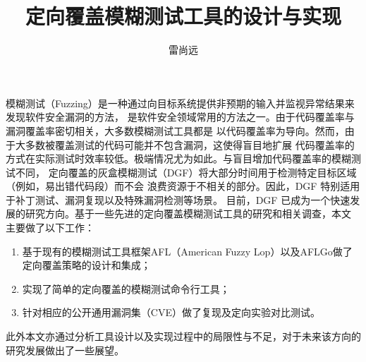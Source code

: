 \documentclass[bachelor]{njupthesis}
\title{定向覆盖模糊测试工具的设计与实现}
\author{雷尚远}
\begin{document}
\makecover

\begin{chineseabstract}
模糊测试（Fuzzing）是一种通过向目标系统提供非预期的输入并监视异常结果来发现软件安全漏洞的方法，
是软件安全领域常用的方法之一。由于代码覆盖率与漏洞覆盖率密切相关，大多数模糊测试工具都是
以代码覆盖率为导向。然而，由于大多数被覆盖测试的代码可能并不包含漏洞，这使得盲目地扩展
代码覆盖率的方式在实际测试时效率较低。极端情况尤为如此。与盲目增加代码覆盖率的模糊测试不同，
定向覆盖的灰盒模糊测试（DGF）将大部分时间用于检测特定目标区域（例如，易出错代码段）而不会
浪费资源于不相关的部分。因此，DGF 特别适用于补丁测试、漏洞复现以及特殊漏洞检测等场景。
目前，DGF 已成为一个快速发展的研究方向。基于一些先进的定向覆盖模糊测试工具的研究和相关调查，本文
主要做了以下工作：
\begin{enumerate}[label=(\arabic*)]
	\item 基于现有的模糊测试工具框架AFL（American Fuzzy Lop）以及AFLGo做了定向覆盖策略的设计和集成；
	\item 实现了简单的定向覆盖的模糊测试命令行工具；
	\item 针对相应的公开通用漏洞集（CVE）做了复现及定向实验对比测试。
\end{enumerate}
此外本文亦通过分析工具设计以及实现过程中的局限性与不足，对于未来该方向的研究发展做出了一些展望。

\end{chineseabstract}
\end{document}

